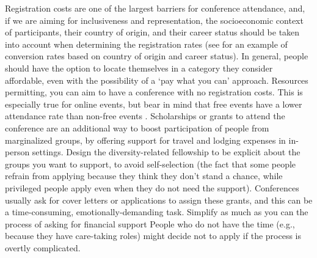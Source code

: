 \documentclass[10pt,letterpaper]{article}
\begin{document}
Registration costs are one of the largest barriers for conference attendance, and, if we are aiming for inclusiveness and representation, the socioeconomic context of participants, their country of origin, and their career status should be taken into account when determining the registration rates \cite{sarabipourChangingScientificMeetings2021, andalibPostdocQueueLabour2018, kaplanPostdocNot2012}
(see \cite{canelon2021cost} for an example of conversion rates based on country of origin and career status). 
In general, people should have the option to locate themselves in a category they consider affordable, even with the possibility of a `pay what you can' approach. 
Resources permitting, you can aim to have a conference with no registration costs. This is especially true for online events, but bear in mind that free events have a lower attendance rate than non-free events \cite{eventbrite_ultimate_2017}. 
Scholarships or grants to attend the conference are an additional way to boost participation of people from marginalized groups, by offering support for travel and lodging expenses in in-person settings.
Design the diversity-related fellowship to be explicit about the groups you want to support, to avoid self-selection (the fact that some people refrain from applying because they think they don't stand a chance, while privileged people apply even when they do not need the support). 
Conferences usually ask for cover letters or applications to assign these grants, and this can be a time-consuming, emotionally-demanding task. Simplify as much as you can the process of asking for financial support %
People who do not have the time (e.g., because they have care-taking roles) might decide not to apply if the process is overtly complicated. 
\end{document}
